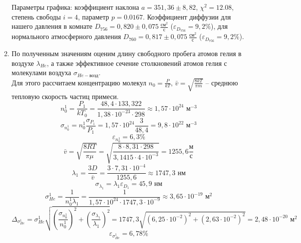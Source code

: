 \documentclass[a4paper]{article}
\begin{document}
\begin{enumerate}
Параметры графика: коэффициент наклона $a = 351,36 \pm 8,82$, $\chi^2 = 12.08$, степень свободы $i = 4$, параметр $p = 0.0167$.
Коэффициент диффузии для нашего давления в комнате $D_{756} = 0,820 \pm 0,075 \ \frac{\text{см}^2}{\text{с}}$ ($\varepsilon_{D_{756}} = 9,2 \%$), для нормального атмосферного давления $D_{760} = 0,817 \pm 0,075 \ \frac{\text{см}^2}{\text{с}}$ ($\varepsilon_{D_{756}} = 9,2 \%$).

\item По полученным значениям оценим длину свободного пробега атомов гелия в воздухе $\lambda_{He}$, а также эффективное сечение столкновений атомов гелия с молекулами воздуха $\sigma_{He-\text{возд}}$.\\
Для этого рассчитаем концентрацию молекул $n_0 = \frac{P}{kT}$, $\displaystyle \bar v = \sqrt{\frac{8kT}{\pi m}}$ -- среднюю тепловую скорость частиц примеси.
\begin{equation*}
	n_0^1 = \frac{P_1}{kT_0} = \frac{48,4 \cdot 133,322}{1,38 \cdot 10^{-23} \cdot 298} \approx 1,57 \cdot 10^{24} \text{ м}^{-3}
\end{equation*}
\begin{equation*}
	\sigma_{n_0^1} = n_0^1\frac{\sigma_{P_1}}{P_1} = 1,57 \cdot 10^{24} \frac{3}{48,4} =  9,8 \cdot 10^{22}\text{ м}^{-3}
\end{equation*}
\begin{equation*}
	\varepsilon_{n_0^1} = 6,3 \%
\end{equation*}
\begin{equation*}
\displaystyle \bar v = \sqrt{\frac{8RT}{\pi \mu}} = \sqrt{\frac{8 \cdot 8,31 \cdot 298}{3,1415 \cdot 4 \cdot 10^{-3}}} = 1255,6 \frac{\text{м}}{\text{с}}
\end{equation*}
\begin{equation*}
	\lambda_1 = \frac{3D}{\displaystyle \bar v} = \frac{3 \cdot 7,31 \cdot 10^{-4}}{1255,6} \approx 1747,3 \text{ нм}
\end{equation*}
\begin{equation*}
	\sigma_{\lambda_1} = \lambda_1\varepsilon_{D_1} = 45,9 \text{ нм}
\end{equation*}
\begin{equation*}
	\sigma_{He}^1 = \frac{1}{n_0^1\lambda_1} = \frac{1}{1,57 \cdot 10^{24} \cdot 1747,3 \cdot 10^{-9}} \approx 3,65 \cdot 10^{-19} \text{ м}^2
\end{equation*}
\begin{equation*}
	\Delta_{\sigma_{He}^1} = \sigma_{He}^1 \sqrt{\left(\frac{\sigma_{n_0^1}}{n_0^1}\right)^2 + \left(\frac{\sigma_{\lambda_1}}{\lambda_1}\right)^2} = 1747,3\sqrt{(6,25 \cdot 10^{-2})^2 + (2,63 \cdot 10^{-2})^2} = 2,48 \cdot 10^{-20} \text{ м}^2
\end{equation*}
\begin{equation*}
	\varepsilon_{\sigma_{He}^1} = 6,78 \%
\end{equation*}


\end{enumerate}
\end{document}
